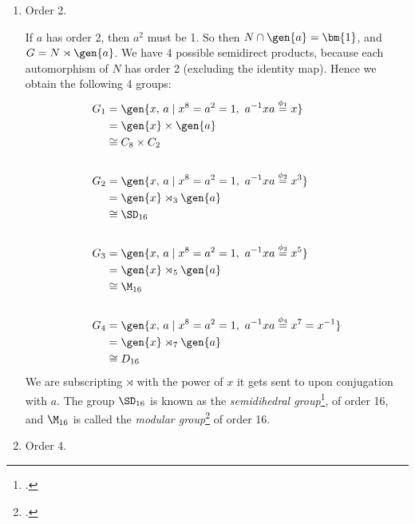 \begin{enumerate}
    \item Order 2.

        If \(a\) has order 2, then \(a^2\) must be 1.
        So then \(N \cap \gen{a} = \bm{1}\), and \(G = N \rtimes \gen{a}\).
        We have 4 possible semidirect products, because each automorphism of \(N\) has order 2 (excluding the
        identity map).
        Hence we obtain the following 4 groups:
        \begin{equation*}
        \begin{aligned}
            G_1 &= \gen{x,\,a \mid x^8 = a^2 = 1,\ a^{-1}xa \overset{\phi_1}{=} x} \\
                &= \gen{x} \times \gen{a} \\
                &\cong C_8 \times C_2 \\
                & \\
            G_2 &= \gen{x,\,a \mid x^8 = a^2 = 1,\ a^{-1}xa \overset{\phi_2}{=} x^{3}} \\
                &= \gen{x} \rtimes_3 \gen{a} \\
                &\cong \SD_{16}\\
                & \\
            G_3 &= \gen{x,\,a \mid x^8 = a^2 = 1,\ a^{-1}xa \overset{\phi_3}{=} x^{5}} \\
                &= \gen{x} \rtimes_5 \gen{a} \\
                &\cong \M_{16}\\
                & \\
            G_4 &= \gen{x,\,a \mid x^8 = a^2 = 1,\ a^{-1}xa \overset{\phi_4}{=} x^7 = x^{-1}} \\
                &= \gen{x} \rtimes_7 \gen{a} \\
                &\cong D_{16}
        \end{aligned}
        \end{equation*}
        We are subscripting \(\rtimes\) with the power of \(x\) it gets sent to upon conjugation with \(a\).
        The group \(\SD_{16}\) is known as the \emph{semidihedral group}\footcite{semidihedral}, of order 16, and
        \(\M_{16}\) is called the \emph{modular group}\footcite{order16names} of order 16.
    \item Order 4.


\end{enumerate}
